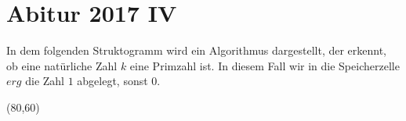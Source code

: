 \documentclass{bschlangaul-aufgabe}
\begin{document}

\section{Abitur 2017 IV
}

In dem folgenden Struktogramm wird ein Algorithmus dargestellt, der
erkennt, ob eine natürliche Zahl $k$ eine Primzahl ist. In diesem Fall
wir in die Speicherzelle $erg$ die Zahl $1$ abgelegt, sonst $0$.

\begin{center}
\begin{struktogramm}(80,60)
\change


    \change
    \ifend
  \untilend

  \change
  \ifend
\ifend
\end{struktogramm}
\end{center}
\end{document}
